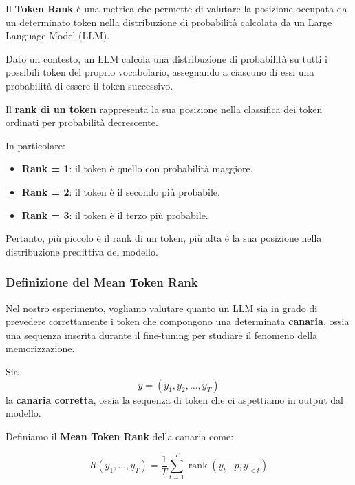 Il \textbf{Token Rank} è una metrica che permette di valutare la posizione occupata da un determinato token nella distribuzione di probabilità calcolata da un Large Language Model (LLM).

Dato un contesto, un LLM calcola una distribuzione di probabilità su tutti i possibili token del proprio vocabolario, assegnando a ciascuno di essi una probabilità di essere il token successivo.

Il \textbf{rank di un token} rappresenta la sua posizione nella classifica dei token ordinati per probabilità decrescente.

In particolare:
\begin{itemize}
    \item \textbf{Rank = 1}: il token è quello con probabilità maggiore.
    \item \textbf{Rank = 2}: il token è il secondo più probabile.
    \item \textbf{Rank = 3}: il token è il terzo più probabile.
\end{itemize}

Pertanto, più piccolo è il rank di un token, più alta è la sua posizione nella distribuzione predittiva del modello.

\subsubsection{Definizione del Mean Token Rank}

Nel nostro esperimento, vogliamo valutare quanto un LLM sia in grado di prevedere correttamente i token che compongono una determinata \textbf{canaria}, ossia una sequenza inserita durante il fine-tuning per studiare il fenomeno della memorizzazione.

Sia
\[
y=(y_1,y_2,\ldots,y_T)
\]
la \textbf{canaria corretta}, ossia la sequenza di token che ci aspettiamo in output dal modello.

Definiamo il \textbf{Mean Token Rank} della canaria come:

\[
\boxed{
R(y_1,\ldots,y_T)
=
\frac{1}{T}
\sum_{t=1}^{T}
\operatorname{rank}(y_t\mid p,y_{<t})
}
\]

